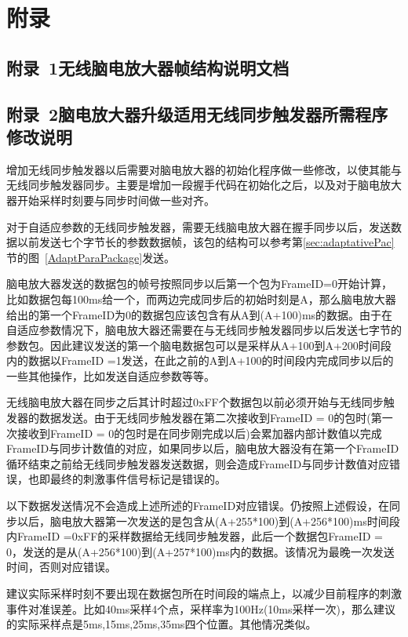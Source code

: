 \chapter*{附\qquad 录}
\section*{附录~1\quad	无线脑电放大器帧结构说明文档}


\section*{附录~2\quad 脑电放大器升级适用无线同步触发器所需程序修改说明}
\songti{}

	增加无线同步触发器以后需要对脑电放大器的初始化程序做一些修改，以使其能与无线同步触发器同步。主要是增加一段握手代码在初始化之后，以及对于脑电放大器开始采样时刻要与同步时间做一些对齐。

	对于自适应参数的无线同步触发器，需要无线脑电放大器在握手同步以后，发送数据以前发送七个字节长的参数数据帧，该包的结构可以参考第\ref{sec:adaptativePac}节的图~\ref{AdaptParaPackage}发送。

	脑电放大器发送的数据包的帧号按照同步以后第一个包为FrameID=0开始计算，比如数据包每100ms给一个，而两边完成同步后的初始时刻是A，那么脑电放大器给出的第一个FrameID为0的数据包应该包含有从A到(A+100)ms的数据。由于在自适应参数情况下，脑电放大器还需要在与无线同步触发器同步以后发送七字节的参数包。因此建议发送的第一个脑电数据包可以是采样从A+100到A+200时间段内的数据以FrameID =1发送，在此之前的A到A+100的时间段内完成同步以后的一些其他操作，比如发送自适应参数等等。

	无线脑电放大器在同步之后其计时超过0xFF个数据包以前必须开始与无线同步触发器的数据发送。由于无线同步触发器在第二次接收到FrameID = 0的包时(第一次接收到FrameID = 0的包时是在同步刚完成以后)会累加器内部计数值以完成FrameID与同步计数值的对应，如果同步以后，脑电放大器没有在第一个FrameID循环结束之前给无线同步触发器发送数据，则会造成FrameID与同步计数值对应错误，也即最终的刺激事件信号标记是错误的。

	以下数据发送情况不会造成上述所述的FrameID对应错误。仍按照上述假设，在同步以后，脑电放大器第一次发送的是包含从(A+255*100)到(A+256*100)ms时间段内FrameID =0xFF的采样数据给无线同步触发器，此后一个数据包FrameID = 0，发送的是从(A+256*100)到(A+257*100)ms内的数据。该情况为最晚一次发送时间，否则对应错误。

	建议实际采样时刻不要出现在数据包所在时间段的端点上，以减少目前程序的刺激事件对准误差。比如40ms采样4个点，采样率为100Hz(10ms采样一次)，那么建议的实际采样点是5ms,15ms,25ms,35ms四个位置。其他情况类似。

